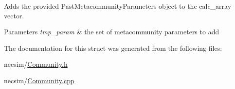 Adds the provided Past\+Metacommunity\+Parameters object to the calc\+\_\+array vector. 


\begin{DoxyParams}{Parameters}
{\em tmp\+\_\+param} & the set of metacommunity parameters to add \\
\hline
\end{DoxyParams}


The documentation for this struct was generated from the following files\+:\begin{DoxyCompactItemize}
\item 
necsim/\hyperlink{_community_8h}{Community.\+h}\item 
necsim/\hyperlink{_community_8cpp}{Community.\+cpp}\end{DoxyCompactItemize}
